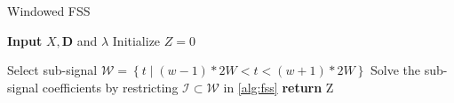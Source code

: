 \documentclass[../thesis.tex]{subfiles}
\begin{document}
\begin{algorithm}[tp]
	\caption{Windowed FSS}
	\label{alg:wFSS}
	\begin{algorithmic}[1]
		\STATE \textbf{Input} $X, \pmb D$ and $\lambda$
		\STATE Initialize $Z=0$

		\STATE Select sub-signal $\mathcal W = \left \{ t \middle| (w-1)*2W < t < (w+1)*2W \right \}$
		\STATE Solve the sub-signal coefficients by restricting $\mathcal I \subset  \mathcal W$ in \autoref{alg:fss}
		\ENDFOR
		\ENDFOR
		\STATE\textbf{return } Z
	\end{algorithmic}
\end{algorithm}





\end{document}
